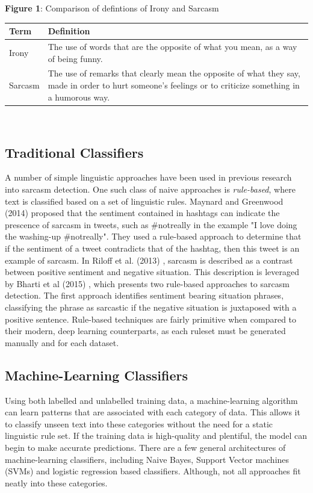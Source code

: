 \documentclass[12pt,a4paper]{article}
\begin{document}
\begin{center}
	\textbf{Figure 1}: Comparison of defintions of Irony and Sarcasm
\end{center}
\begin{center}
\begin{tabular}{p{2cm}p{12cm}}
	\hline
	\textbf{Term} & \textbf{Definition}\\
	\hline\hline
	Irony & The use of words that are the opposite of what you mean, as a way of being funny. \cite{cambridgeirony2020}\\
	\hline
	Sarcasm & The use of remarks that clearly mean the opposite of what they say, made in order to hurt someone's feelings or to criticize something in a humorous way. \cite{cambridgesarcasm2020}\\
	\hline
\end{tabular}\\
\end{center}

\subsection{Traditional Classifiers}
\noindent A number of simple linguistic approaches have been used in previous research into sarcasm detection. One such class of naive approaches is \textit{rule-based}, where text is classified based on a set of linguistic rules. Maynard and Greenwood (2014) \cite{maynard2014cares} proposed that the sentiment contained in hashtags can indicate the prescence of sarcasm in tweets, such as \#notreally in the example "I love doing the washing-up \#notreally". They used a rule-based approach to determine that if the sentiment of a tweet contradicts that of the hashtag, then this tweet is an example of sarcasm. In Riloff et al. (2013) \cite{riloff2013sarcasm}, sarcasm is described as a contrast between positive sentiment and negative situation. This description is leveraged by Bharti et al (2015) \cite{bharti2015parsing}, which presents two rule-based approaches to sarcasm detection. The first approach identifies sentiment bearing situation phrases, classifying the phrase as sarcastic if the negative situation is juxtaposed with a positive sentence. Rule-based techniques are fairly primitive when compared to their modern, deep learning counterparts, as each ruleset must be generated manually and for each dataset.

\subsection{Machine-Learning Classifiers}
\noindent Using both labelled and unlabelled training data, a machine-learning algorithm can learn patterns that are associated with each category of data. This allows it to classify unseen text into these categories without the need for a static linguistic rule set. If the training data is high-quality and plentiful, the model can begin to make accurate predictions. There are a few general architectures of machine-learning classifiers, including Naive Bayes, Support Vector machines (SVMs) and logistic regression based classifiers. Although, not all approaches fit neatly into these categories.
\end{document}
